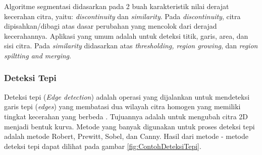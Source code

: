 Algoritme segmentasi didasarkan pada 2 buah karakteristik nilai derajat kecerahan citra, yaitu: \textit{discontinuity} dan \textit{similarity}. Pada \textit{discontinuity}, citra dipisahkan/dibagi atas dasar perubahan yang mencolok dari derajad kecerahannya. Aplikasi yang umum adalah untuk deteksi titik, garis, area, dan sisi citra. Pada \textit{similarity} didasarkan atas \textit{thresholding, region growing}, dan \textit{region spiltting and merging}.
\\

\subsubsection{Deteksi Tepi}
Deteksi tepi (\textit{Edge detection}) adalah operasi yang dijalankan untuk mendeteksi garis tepi (\textit{edges}) yang membatasi dua wilayah citra homogen yang memiliki tingkat kecerahan yang berbeda \cite{gonzalez}. Tujuannya adalah untuk mengubah citra 2D menjadi bentuk kurva. Metode yang banyak digunakan untuk proses deteksi tepi adalah metode Robert, Prewitt, Sobel, dan Canny. Hasil dari metode - metode deteksi tepi dapat dilihat pada gambar \ref{fig:ContohDeteksiTepi}.

